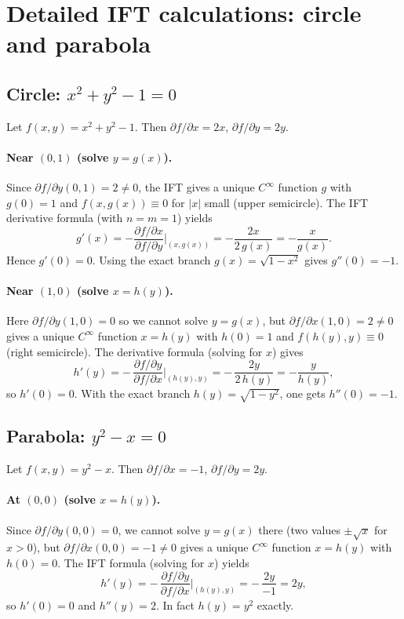 \documentclass[12pt,a4paper]{article}
\theoremstyle{plain}
\theoremstyle{definition}
\theoremstyle{remark}
\theoremstyle{remark}
\begin{document}
	\section*{Detailed IFT calculations: circle and parabola}
	
	\subsection*{Circle: $x^2+y^2-1=0$}
	Let $f(x,y)=x^2+y^2-1$. Then $\partial f/\partial x=2x$, $\partial f/\partial y=2y$.
	
	\paragraph{Near $(0,1)$ (solve $y=g(x)$).}
	Since $\partial f/\partial y(0,1)=2\neq 0$, the IFT gives a unique $C^\infty$ function
	$g$ with $g(0)=1$ and $f(x,g(x))\equiv 0$ for $|x|$ small (upper semicircle).
	The IFT derivative formula (with $n=m=1$) yields
	\[
	g'(x)= -\frac{\partial f/\partial x}{\partial f/\partial y}\Big|_{(x,g(x))}
	= -\frac{2x}{2\,g(x)} = -\frac{x}{g(x)}.
	\]
	Hence $g'(0)=0$. Using the exact branch $g(x)=\sqrt{1-x^2}$ gives
	$g''(0)=-1$.
	
	\paragraph{Near $(1,0)$ (solve $x=h(y)$).}
	Here $\partial f/\partial y(1,0)=0$ so we cannot solve $y=g(x)$,
	but $\partial f/\partial x(1,0)=2\neq0$ gives a unique $C^\infty$ function $x=h(y)$ with
	$h(0)=1$ and $f(h(y),y)\equiv 0$ (right semicircle).
	The derivative formula (solving for $x$) gives
	\[
	h'(y) = -\,\frac{\partial f/\partial y}{\partial f/\partial x}\Big|_{(h(y),y)}
	= -\,\frac{2y}{2\,h(y)} = -\frac{y}{h(y)},
	\]
	so $h'(0)=0$. With the exact branch $h(y)=\sqrt{1-y^2}$, one gets $h''(0)=-1$.
	
	\subsection*{Parabola: $y^2-x=0$}
	Let $f(x,y)=y^2-x$. Then $\partial f/\partial x=-1$, $\partial f/\partial y=2y$.
	
	\paragraph{At $(0,0)$ (solve $x=h(y)$).}
	Since $\partial f/\partial y(0,0)=0$, we cannot solve $y=g(x)$ there (two values $\pm\sqrt{x}$ for $x>0$),
	but $\partial f/\partial x(0,0)=-1\neq0$ gives a unique $C^\infty$ function $x=h(y)$ with $h(0)=0$.
	The IFT formula (solving for $x$) yields
	\[
	h'(y) = -\,\frac{\partial f/\partial y}{\partial f/\partial x}\Big|_{(h(y),y)}
	= -\,\frac{2y}{-1} = 2y,
	\]
	so $h'(0)=0$ and $h''(y)=2$. In fact $h(y)=y^2$ exactly.
	
\end{document}
